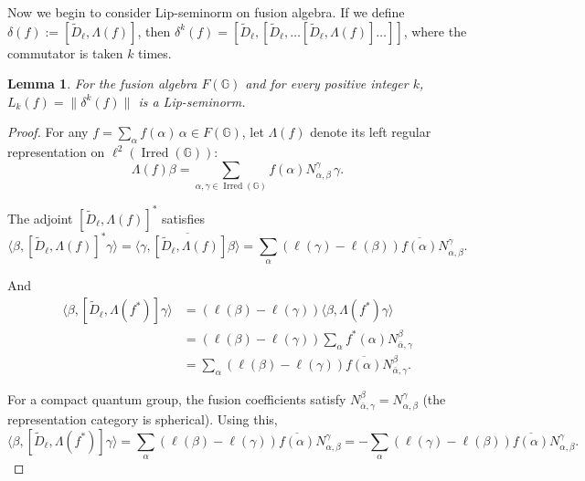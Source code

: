 \documentclass[12pt, reqno]{amsart}
\newtheorem{lemma}[theorem]{Lemma}
\theoremstyle{definition}
\theoremstyle{remark}
\numberwithin{equation}{section}
\begin{document}
Now we begin to consider Lip-seminorm on fusion algebra.
If we define \(\delta(f):=[\tilde{D}_\ell,\Lambda(f)]\), then 
\(\delta^k(f)= [\tilde{D}_\ell, [\tilde{D}_\ell, \dots [\tilde{D}_\ell,\Lambda(f)]\dots ]]\),
where the commutator is taken \(k\) times.

\begin{lemma}
    For the fusion algebra \(F(\mathbb{G})\) and for every positive integer 
    \(k\), \(L_k(f)=\| \delta^k(f)\|
\) is a Lip-seminorm.
\end{lemma}
\begin{proof}
    For any \(f = \sum_{\alpha} f(\alpha)\,\alpha \in F(\mathbb{G})\), let 
    \(\Lambda(f)\) denote its left regular representation on 
    \(\ell^2(\operatorname{Irred}(\mathbb{G}))\):
    \[
    \Lambda(f)\beta = \sum_{\alpha,\gamma\in\operatorname{Irred}(\mathbb{G})} 
    f(\alpha) N_{\alpha,\beta}^{\gamma} \,\gamma.
    \]

    The adjoint \([\tilde{D}_\ell,\Lambda(f)]^*\) satisfies
    \[
    \langle \beta, [\tilde{D}_\ell,\Lambda(f)]^* \gamma \rangle
    = \overline{\langle \gamma, [\tilde{D}_\ell,\Lambda(f)]\beta \rangle}
    = \sum_{\alpha} (\ell(\gamma)-\ell(\beta)) \overline{f(\alpha)} 
      N_{\alpha,\beta}^{\gamma}.
    \]

    And 
    \begin{align*}
    \langle \beta, [\tilde{D}_\ell,\Lambda(f^*)] \gamma \rangle
    &= (\ell(\beta)-\ell(\gamma)) \langle \beta,\Lambda(f^*)\gamma \rangle \\
    &= (\ell(\beta)-\ell(\gamma)) \sum_{\alpha} f^*(\alpha) 
       N_{\bar\alpha,\gamma}^{\beta} \\
    &= \sum_{\alpha} (\ell(\beta)-\ell(\gamma)) \overline{f(\alpha)} 
       N_{\bar\alpha,\gamma}^{\beta}.
    \end{align*}

    For a compact quantum group, the fusion coefficients satisfy 
    \(N_{\bar\alpha,\gamma}^{\beta}=N_{\alpha,\beta}^{\gamma}\) 
    (the representation category is spherical). Using this,
    \[
    \langle \beta, [\tilde{D}_\ell,\Lambda(f^*)] \gamma \rangle
    = \sum_{\alpha} (\ell(\beta)-\ell(\gamma)) \overline{f(\alpha)} 
      N_{\alpha,\beta}^{\gamma}
    = -\sum_{\alpha} (\ell(\gamma)-\ell(\beta)) \overline{f(\alpha)} 
      N_{\alpha,\beta}^{\gamma}.
    \]


\end{proof}
\end{document}
